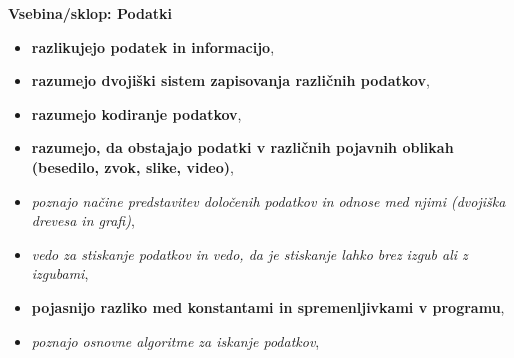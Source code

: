 \textbf{Vsebina/sklop: Podatki}
\begin{itemize}
\tightlist
\item \textbf{razlikujejo podatek in informacijo},
\item \textbf{razumejo dvojiški sistem zapisovanja različnih podatkov},
\item \textbf{razumejo kodiranje podatkov},
\item \textbf{razumejo, da obstajajo podatki v različnih pojavnih oblikah
  (besedilo, zvok, slike, video)},
\item \emph{poznajo načine predstavitev določenih podatkov in odnose med
  njimi (dvojiška drevesa in grafi)},
\item \emph{vedo za stiskanje podatkov in vedo, da je stiskanje lahko brez
  izgub ali z izgubami},
\item \textbf{pojasnijo razliko med konstantami in spremenljivkami v programu},
\item \emph{poznajo osnovne algoritme za iskanje podatkov},
\end{itemize}

